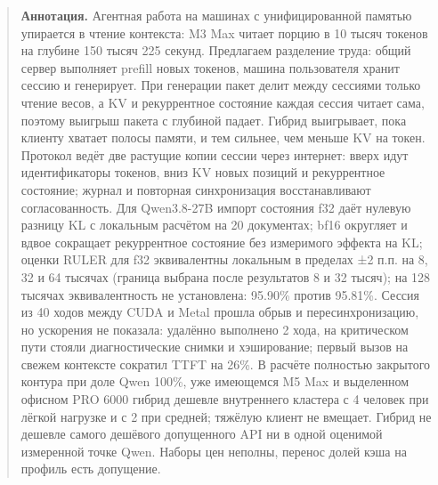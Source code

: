 \begin{quote}\small
\textbf{Аннотация.} Агентная работа на машинах с унифицированной памятью упирается в чтение контекста: M3 Max читает порцию в 10 тысяч токенов на глубине 150 тысяч 225 секунд.
Предлагаем разделение труда: общий сервер выполняет prefill новых токенов, машина пользователя хранит сессию и генерирует.
При генерации пакет делит между сессиями только чтение весов, а KV и рекуррентное состояние каждая сессия читает сама, поэтому выигрыш пакета с глубиной падает.
Гибрид выигрывает, пока клиенту хватает полосы памяти, и тем сильнее, чем меньше KV на токен.
Протокол ведёт две растущие копии сессии через интернет: вверх идут идентификаторы токенов, вниз KV новых позиций и рекуррентное состояние; журнал и повторная синхронизация восстанавливают согласованность.
Для Qwen3.8-27B импорт состояния f32 даёт нулевую разницу KL с локальным расчётом на 20 документах; bf16 округляет и вдвое сокращает рекуррентное состояние без измеримого эффекта на KL; оценки RULER для f32 эквивалентны локальным в пределах ±2 п.п. на 8, 32 и 64 тысячах (граница выбрана после результатов 8 и 32 тысяч); на 128 тысячах эквивалентность не установлена: 95.90\% против 95.81\%.
Сессия из 40 ходов между CUDA и Metal прошла обрыв и пересинхронизацию, но ускорения не показала: удалённо выполнено 2 хода, на критическом пути стояли диагностические снимки и хэширование; первый вызов на свежем контексте сократил TTFT на 26\%.
В расчёте полностью закрытого контура при доле Qwen 100\%, уже имеющемся M5 Max и выделенном офисном PRO 6000 гибрид дешевле внутреннего кластера с 4 человек при лёгкой нагрузке и с 2 при средней; тяжёлую клиент не вмещает.
Гибрид не дешевле самого дешёвого допущенного API ни в одной оценимой измеренной точке Qwen.
Наборы цен неполны, перенос долей кэша на профиль есть допущение.
\end{quote}
